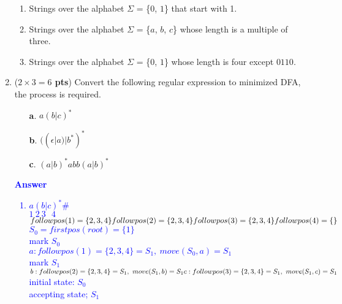 \documentclass[10pt]{article}
\newcommand {\pts}[1]{({\bf #1 pts})}
\begin{document}
\begin{enumerate}
{\begin{enumerate}
                  \item Strings over the alphabet $\Sigma$ = \{$0$, $1$\} that start with 1.
                  \item Strings over the alphabet $\Sigma$ = \{$a$, $b$, $c$\} whose length is a multiple of three.
                  \item Strings over the alphabet $\Sigma$ = \{$0$, $1$\} whose length is four except $0110$.
              \end{enumerate}
          }
    \item \pts{$2\times 3=6$} Convert the following regular expression to minimized DFA, the process is required.
          \begin{enumerate}
              \item[\textbf{a}.] $a(b|c)^{*}$
              \item[\textbf{b}.] $((\epsilon|a)|b^{*})^{*}$
              \item[\textbf{c}.] $(a|b)^{*}abb(a|b)^{*}$
          \end{enumerate}
          \textcolor{blue}{
              \textbf{Answer}
              \begin{enumerate}
                  \item $a(b|c)^*\#$\\
                        $1~2~3~~~4$\\
                        $followpos(1)=\{2,3,4\}\\
                            followpos(2)=\{2,3,4\}\\
                            followpos(3)=\{2,3,4\}\\
                            followpos(4)=\{\}$\\
                        $S_0=firstpos(root)=\{1\}$\\
                        mark $S_0$\\
                        $a:followpos(1)=\{2,3,4\}=S_1,~move(S_0,a)=S_1$\\
                        mark $S_1$\\
                        $b:followpos(2)=\{2,3,4\}=S_1,~move(S_1,b)=S_1\\
                            c:followpos(3)=\{2,3,4\}=S_1,~move(S_1,c)=S_1$\\
                        initial state: $S_0$\\
                        accepting state; $S_1$\\
                        \begin{tikzpicture}[shorten >=1pt,node distance=2cm,on grid,auto]

\end{tikzpicture}
\end{enumerate}}
\end{enumerate}
\end{document}
